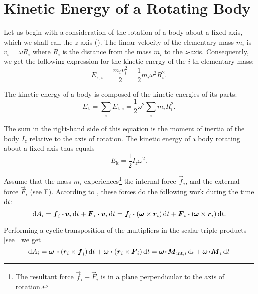\section{Kinetic Energy of a Rotating Body}\label{sec:5_6}

Let us begin with a consideration of the rotation of a body about a fixed axis, which we shall call the $z$-axis (). The linear velocity of the elementary mass $m_i$ is $v_i=\omega R_i$ where $R_i$ is the distance from the mass $m_i$ to the $z$-axis. Consequently, we get the following expression for the kinetic energy of the $i$-th elementary mass:
\begin{equation*}
	E_{\text{k},i} = \frac{m_i v_i^2}{2} = \frac{1}{2}m_i \omega^2 R_i^2.
\end{equation*}

\noindent
The kinetic energy of a body is composed of the kinetic energies of its parts:
\begin{equation*}
	E_{\text{k}} = \sum_i E_{\text{k},i} = \frac{1}{2}\omega^2 \sum_i m_i R_i^2.
\end{equation*}

\noindent
The sum in the right-hand side of this equation is the moment of inertia of the body $I_z$ relative to the axis of rotation. The kinetic energy of a body rotating about a fixed axis thus equals
\begin{equation}\label{eq:5_46}
	E_{\text{k}} = \frac{1}{2} I_z \omega^2.
\end{equation}

Assume that the mass $m_i$ experiences\footnote{The resultant force $\vec{f}_i+\vec{F}_i$ is in a plane perpendicular to the axis of rotation.} the internal force $\vec{f}_i$, and the external force $\vec{F}_i$ (see F). According to , these forces do the following work during the time $\mathrm{d} t$:
\begin{equation*}
\mathrm{d} A_i = \boldsymbol{f}_{i}\boldsymbol{\cdot}\boldsymbol{v}_{i}\,\mathrm{d} t + \boldsymbol{F}_{i}\boldsymbol{\cdot}\boldsymbol{v}_{i}\,\mathrm{d} t = \boldsymbol{f}_i\boldsymbol{\cdot}(\boldsymbol{\omega}\times\boldsymbol{r}_i)\,\mathrm{d} t + \boldsymbol{F}_i\boldsymbol{\cdot}(\boldsymbol{\omega}\times\boldsymbol{r}_i)\,\mathrm{d} t.
\end{equation*}

\noindent
Performing a cyclic transposition of the multipliers in the scalar triple products [see ] we get
\begin{equation}\label{eq:5_47}
\mathrm{d} A_i = \boldsymbol{\omega}\,\boldsymbol{\cdot}(\boldsymbol{r}_{i}\times\boldsymbol{f}_{i})\,\mathrm{d} t + \boldsymbol{\omega}\boldsymbol{\cdot}(\boldsymbol{r}_{i}\times\boldsymbol{F}_{i})\,\mathrm{d} t = \boldsymbol{\omega\!\cdot\!M}_{\text{int},i}\,\mathrm{d} t + \boldsymbol{\omega\!\cdot\!M}_i\,\mathrm{d} t
\end{equation}


